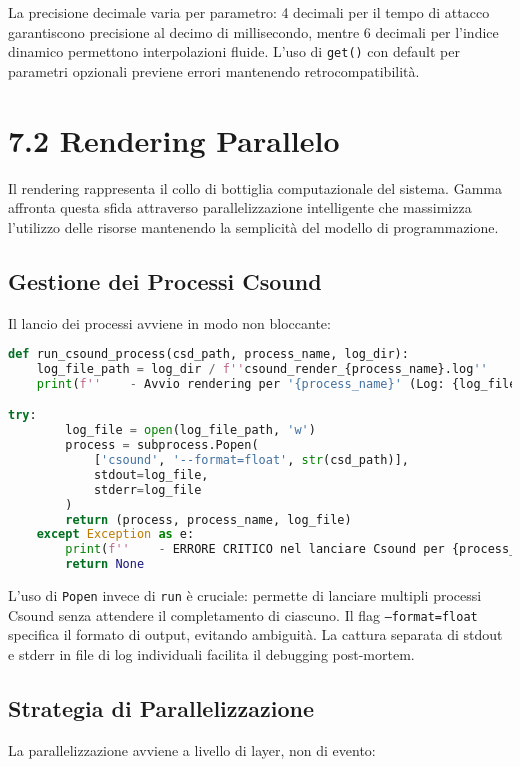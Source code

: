 La precisione decimale varia per parametro: 4 decimali per il tempo di attacco garantiscono precisione al decimo di millisecondo, mentre 6 decimali per l'indice dinamico permettono interpolazioni fluide. L'uso di \texttt{get()} con default per parametri opzionali previene errori mantenendo retrocompatibilità.
\section{7.2 Rendering Parallelo}
Il rendering rappresenta il collo di bottiglia computazionale del sistema. Gamma affronta questa sfida attraverso parallelizzazione intelligente che massimizza l'utilizzo delle risorse mantenendo la semplicità del modello di programmazione.
\subsection{Gestione dei Processi Csound}
Il lancio dei processi avviene in modo non bloccante:

\begin{lstlisting}[language=Python]
def run_csound_process(csd_path, process_name, log_dir):
    log_file_path = log_dir / f''csound_render_{process_name}.log''
    print(f''    - Avvio rendering per '{process_name}' (Log: {log_file_path.name})'')

try:
        log_file = open(log_file_path, 'w')
        process = subprocess.Popen(
            ['csound', '--format=float', str(csd_path)], 
            stdout=log_file, 
            stderr=log_file
        )
        return (process, process_name, log_file)
    except Exception as e:
        print(f''    - ERRORE CRITICO nel lanciare Csound per {process_name}: {e}'')
        return None
\end{lstlisting}

L'uso di \texttt{Popen} invece di \texttt{run} è cruciale: permette di lanciare multipli processi Csound senza attendere il completamento di ciascuno. Il flag \texttt{--format=float} specifica il formato di output, evitando ambiguità. La cattura separata di stdout e stderr in file di log individuali facilita il debugging post-mortem.
\subsection{Strategia di Parallelizzazione}
La parallelizzazione avviene a livello di layer, non di evento:

